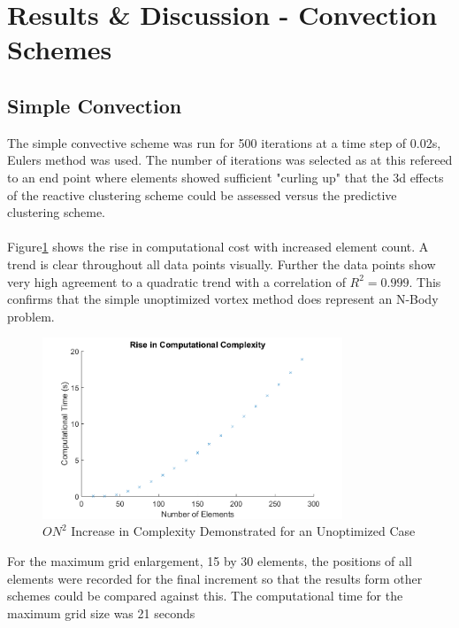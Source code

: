 \section{Results \& Discussion - Convection Schemes}
\subsection{Simple Convection}
The simple convective scheme was run for 500 iterations at a time step of 0.02s, Eulers method was used. The number of iterations was selected as at this refereed to an end point where elements showed sufficient "curling up" that the 3d effects of the reactive clustering scheme could be assessed versus the predictive clustering scheme.
\\\\
Figure\ref{fig:SimConvCost} shows the rise in computational cost with increased element count. A trend is clear throughout all data points visually. Further the data points show very high agreement to a quadratic trend with a correlation of $R^2=0.999$. This confirms that the simple unoptimized vortex method does represent an N-Body problem.

\begin{figure}[H]
\centering
\includegraphics[width=0.8\textwidth]{Figures/SimpleConvCost.png}
\caption{\label{fig:SimConvCost} $ON^2$ Increase in Complexity Demonstrated for an Unoptimized Case}
\end{figure} 

For the maximum grid enlargement, 15 by 30 elements, the positions of all elements were recorded for the final increment so that the results form other schemes could be compared against this. The computational time for the maximum grid size was 21 seconds

